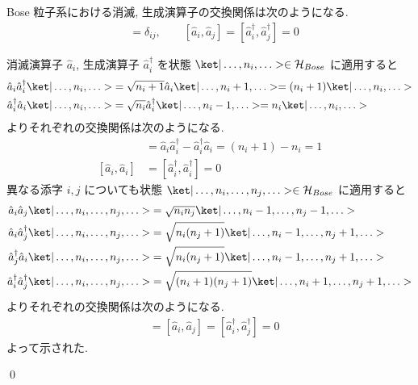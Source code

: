 \documentclass[uplatex,dvipdfmx,a4paper,11pt]{jlreq}
\makeatletter
\newcommand{\HH}{\mathcal{H}}
\numberwithin{equation}{section}
\theoremstyle{definition}
\renewenvironment{proof}[1][\proofname]{\par
  \normalfont
  \topsep6\p@\@plus6\p@ \trivlist
  \item[\hskip\labelsep{\bfseries #1}\@addpunct{\bfseries}]\ignorespaces\quad\par
}{
  \qed\endtrivlist\@endpefalse
}
\renewcommand\proofname{証明}
\makeatother
\begin{document}
\begin{proposition}[Q21-37]
  Bose 粒子系における消滅, 生成演算子の交換関係は次のようになる.
  \begin{align}
    [\hat{a}_i, \hat{a}_j^\dagger] & = \delta_{ij}, \qquad [\hat{a}_i, \hat{a}_j] = [\hat{a}_i^\dagger, \hat{a}_j^\dagger] = 0
  \end{align}
\end{proposition}
\begin{proof}
  消滅演算子 $\hat{a}_i$, 生成演算子 $\hat{a}_i^\dagger$ を状態 $\ket|\ldots,n_i,\ldots>\in\HH_{Bose}$ に適用すると
  \begin{align}
    \hat{a}_i\hat{a}_i^\dagger\ket|\ldots,n_i,\ldots> & = \sqrt{n_i + 1}\hat{a}_i\ket|\ldots,n_i+1,\ldots> = (n_i + 1)\ket|\ldots,n_i,\ldots> \\
    \hat{a}_i^\dagger\hat{a}_i\ket|\ldots,n_i,\ldots> & = \sqrt{n_i}\hat{a}_i^\dagger\ket|\ldots,n_i-1,\ldots> = n_i\ket|\ldots,n_i,\ldots>
  \end{align}
  よりそれぞれの交換関係は次のようになる.
  \begin{align}
    [\hat{a}_i, \hat{a}_i^\dagger] & = \hat{a}_i\hat{a}_i^\dagger - \hat{a}_i^\dagger\hat{a}_i = (n_i + 1) - n_i = 1 \\
    [\hat{a}_i, \hat{a}_i]         & = [\hat{a}_i^\dagger, \hat{a}_i^\dagger] = 0
  \end{align}
  異なる添字 $i, j$ についても状態 $\ket|\ldots,n_i,\ldots,n_j,\ldots>\in\HH_{Bose}$ に適用すると
  \begin{align}
    \hat{a}_i\hat{a}_j\ket|\ldots,n_i,\ldots,n_j,\ldots>                 & = \sqrt{n_in_j}\ket|\ldots,n_i-1,\ldots,n_j-1,\ldots>             \\
    \hat{a}_i\hat{a}_j^\dagger\ket|\ldots,n_i,\ldots,n_j,\ldots>         & = \sqrt{n_i(n_j + 1)}\ket|\ldots,n_i-1,\ldots,n_j+1,\ldots>       \\
    \hat{a}_j^\dagger\hat{a}_i\ket|\ldots,n_i,\ldots,n_j,\ldots>         & = \sqrt{n_i(n_j + 1)}\ket|\ldots,n_i-1,\ldots,n_j+1,\ldots>       \\
    \hat{a}_i^\dagger\hat{a}_j^\dagger\ket|\ldots,n_i,\ldots,n_j,\ldots> & = \sqrt{(n_i + 1)(n_j + 1)}\ket|\ldots,n_i+1,\ldots,n_j+1,\ldots>
  \end{align}
  よりそれぞれの交換関係は次のようになる.
  \begin{align}
    [\hat{a}_i, \hat{a}_j^\dagger] & = [\hat{a}_i, \hat{a}_j] = [\hat{a}_i^\dagger, \hat{a}_j^\dagger] = 0
  \end{align}
  よって示された.
\end{proof}
\end{document}

